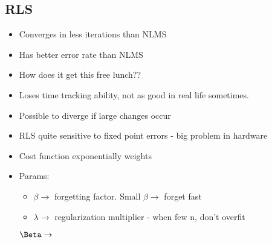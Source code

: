 \documentclass[12pt, letter]{article}
\begin{document}
\subsection*{RLS}
\begin{itemize}
	\item Converges in less iterations than NLMS
	\item Has better error rate than NLMS
	\item How does it get this free lunch??
	\item Loses time tracking ability, not as good in real life sometimes.
	\item Possible to diverge if large changes occur
	\item RLS quite sensitive to fixed point errors - big problem in hardware
	\item Cost function exponentially weights
	\item Params: 
	\begin{itemize}
		\item $\beta \to$ forgetting factor. Small $\beta \to$ forget fast
		\item $\lambda \to$ regularization multiplier - when few n, don't overfit
	\end{itemize}
	$\Beta \to$
\end{itemize}
\end{document}

